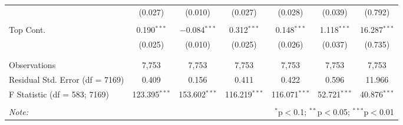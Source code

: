 \begin{table}[!htbp]
\begin{tabular}{@{\extracolsep{5pt}}lcccccc}
  & (0.027) & (0.010) & (0.027) & (0.028) & (0.039) & (0.792) \\ 
  & & & & & & \\ 
 Top Cont. & 0.190$^{***}$ & $-$0.084$^{***}$ & 0.312$^{***}$ & 0.148$^{***}$ & 1.118$^{***}$ & 16.287$^{***}$ \\ 
  & (0.025) & (0.010) & (0.025) & (0.026) & (0.037) & (0.735) \\ 
  & & & & & & \\ 
\hline \\[-1.8ex] 
Observations & 7,753 & 7,753 & 7,753 & 7,753 & 7,753 & 7,753 \\ 
Residual Std. Error (df = 7169) & 0.409 & 0.156 & 0.411 & 0.422 & 0.596 & 11.966 \\ 
F Statistic (df = 583; 7169) & 123.395$^{***}$ & 153.602$^{***}$ & 116.219$^{***}$ & 116.071$^{***}$ & 52.721$^{***}$ & 40.876$^{***}$ \\ 
\hline 
\hline \\[-1.8ex] 
\textit{Note:}  & \multicolumn{6}{r}{$^{*}$p$<$0.1; $^{**}$p$<$0.05; $^{***}$p$<$0.01} \\ 
\end{tabular} 
\end{table} 

